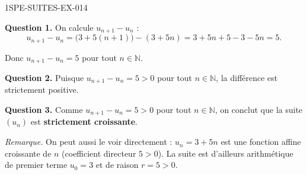 \begin{corrige}{1SPE-SUITES-EX-014}


\textbf{Question 1.} On calcule $u_{n+1} - u_n$ :
\[
u_{n+1} - u_n = \bigl(3 + 5(n+1)\bigr) - (3 + 5n) = 3 + 5n + 5 - 3 - 5n = 5.
\]

Donc $u_{n+1} - u_n = 5$ pour tout $n \in \mathbb{N}$.

\textbf{Question 2.} Puisque $u_{n+1} - u_n = 5 > 0$ pour tout $n \in \mathbb{N}$, la différence est strictement positive.


\textbf{Question 3.} Comme $u_{n+1} - u_n = 5 > 0$ pour tout $n \in \mathbb{N}$, on conclut que la suite $(u_n)$ est \textbf{strictement croissante}.

\medskip
\textit{Remarque.} On peut aussi le voir directement : $u_n = 3 + 5n$ est une fonction affine croissante de $n$ (coefficient directeur $5 > 0$). La suite est d'ailleurs arithmétique de premier terme $u_0 = 3$ et de raison $r = 5 > 0$.

\end{corrige}
